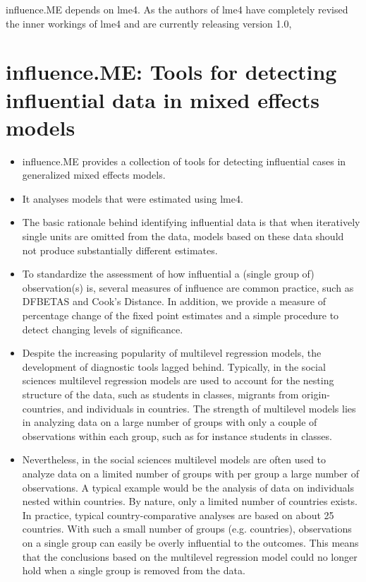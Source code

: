 influence.ME depends on lme4. As the authors of lme4 have completely revised the inner workings of lme4 and are currently releasing version 1.0, 

\section{influence.ME: Tools for detecting influential data in mixed effects models}
\begin{itemize}
\item influence.ME provides a collection of tools for detecting influential cases in generalized mixed effects models. 
\item It analyses models that were estimated using lme4. 
\item The basic rationale behind identifying influential data is that when iteratively single units are omitted from the data, 
models based on these data should not produce substantially different estimates. 
\item To standardize the assessment of how influential a (single group of) observation(s) is, several measures of influence 
are common practice, such as DFBETAS and Cook's Distance. In addition, we provide a measure of percentage change of the 
fixed point estimates and a simple procedure to detect changing levels of significance.



\item Despite the increasing popularity of multilevel regression models, the development of diagnostic tools lagged behind. Typically, in the social sciences multilevel regression models are used to account for the nesting structure of the data, such as students in classes, migrants from origin-countries, and individuals in countries. The strength of multilevel models lies in analyzing data on a large number of groups with only a couple of observations within each group, such as for instance students in classes.

\item Nevertheless, in the social sciences multilevel models are often used to analyze data on a limited number of groups with per group a large number of observations. A typical example would be the analysis of data on individuals nested within countries. By nature, only a limited number of countries exists. In practice, typical country-comparative analyses are based on about 25 countries. With such a small number of groups (e.g. countries), observations on a single group can easily be overly influential to the outcomes. This means that the conclusions based on the multilevel regression model could no longer hold when a single group is removed from the data.


\end{itemize}
